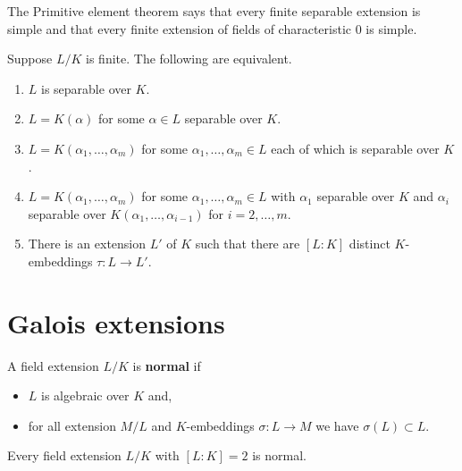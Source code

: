 \documentclass[12pt, a4paper]{article}
\begin{document}
\begin{mdremark}
    The Primitive element theorem says that every finite separable extension is simple and that every finite extension of fields of characteristic \(0\) is simple.
\end{mdremark}

\begin{mdprop}[Summary]
    Suppose \(L/K\) is finite. The following are equivalent.
    \begin{enumerate}
        \item \(L\) is separable over \(K\).
        \item \(L=K(\alpha)\) for some \(\alpha \in L\) separable over \(K\).
        \item \(L=K(\alpha_1,\ldots,\alpha_m)\) for some \(\alpha_1,\ldots,\alpha_m \in L\) each of which is separable over \(K\).
        \item \(L=K(\alpha_1,\ldots,\alpha_m)\) for some \(\alpha_1,\ldots,\alpha_m \in L\) with \(\alpha_1\) separable over \(K\) and \(\alpha_i\) separable over \(K(\alpha_1,\ldots,\alpha_{i-1})\) for \(i=2,\ldots,m\). 
        \item There is an extension \(L'\) of \(K\) such that there are \([L:K]\) distinct \(K\)-embeddings \(\tau:L \to L'\).
    \end{enumerate}
\end{mdprop}

\section{Galois extensions}

\begin{definition}
    A field extension \(L/K\) is \textbf{normal} if
    \begin{itemize}
        \item \(L\) is algebraic over \(K\) and,
        \item for all extension \(M/L\) and \(K\)-embeddings \(\sigma:L\to M\) we have \(\sigma(L)\subset L\).
    \end{itemize} 
\end{definition}

\begin{mdprop}
    Every field extension \(L/K\) with \([L:K]=2\) is normal.
\end{mdprop}
\end{document}
